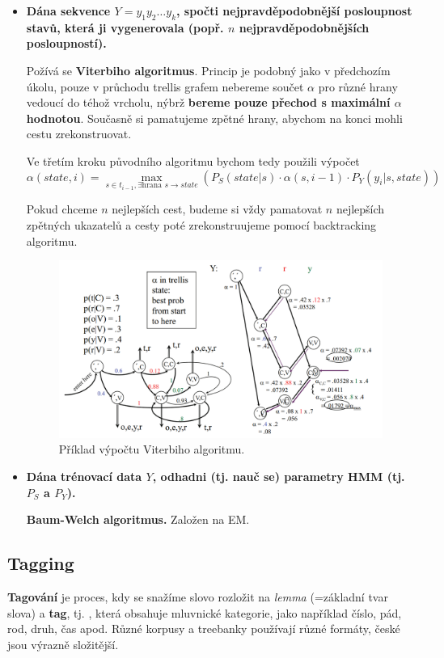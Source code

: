 \documentclass[11pt]{report} %
\numberwithin{equation}{section}
\begin{document}
\begin{itemize}
	
	
	\item \textbf{Dána sekvence $Y = y_1y_2\dots y_k$, spočti nejpravděpodobnější posloupnost stavů, která ji vygenerovala (popř. $n$ nejpravděpodobnějších posloupností).}
	
	Požívá se \textbf{Viterbiho algoritmus}. Princip je podobný jako v předchozím úkolu, pouze v průchodu trellis grafem nebereme součet $\alpha$ pro různé hrany vedoucí do téhož vrcholu, nýbrž \textbf{bereme pouze přechod s maximální $\alpha$ hodnotou}. Současně si pamatujeme zpětné hrany, abychom na konci mohli cestu zrekonstruovat.
		
	Ve třetím kroku původního algoritmu bychom tedy použili výpočet  $$\alpha(state,i) = \max\limits_{s \in t_{i-1}, \exists\text{hrana }s\rightarrow state} (P_S(state|s) \cdot \alpha(s, i-1) \cdot P_Y(y_i|s,state))$$
	
	Pokud chceme $n$ nejlepších cest, budeme si vždy pamatovat $n$ nejlepších zpětných ukazatelů a cesty poté zrekonstruujeme pomocí backtracking algoritmu.
	
	\begin{figure}[H]
		\centering
		\includegraphics[scale=1]{img/viterbi.png}
		\caption{Příklad výpočtu Viterbiho algoritmu.}
	\end{figure}


	\item \textbf{Dána trénovací data $Y$, odhadni (tj. nauč se) parametry HMM (tj. $P_S$ a $P_Y$).}
	
	\textbf{Baum-Welch algoritmus.} Založen na EM. %
	
\end{itemize}


\subsection{Tagging}
\textbf{Tagování} je proces, kdy se snažíme slovo rozložit na \textit{lemma} (=základní tvar slova) a \textbf{tag}, tj. , která obsahuje mluvnické kategorie, jako například číslo, pád, rod, druh, čas apod. Různé korpusy a treebanky používají různé formáty, české jsou výrazně složitější.
\end{document}
